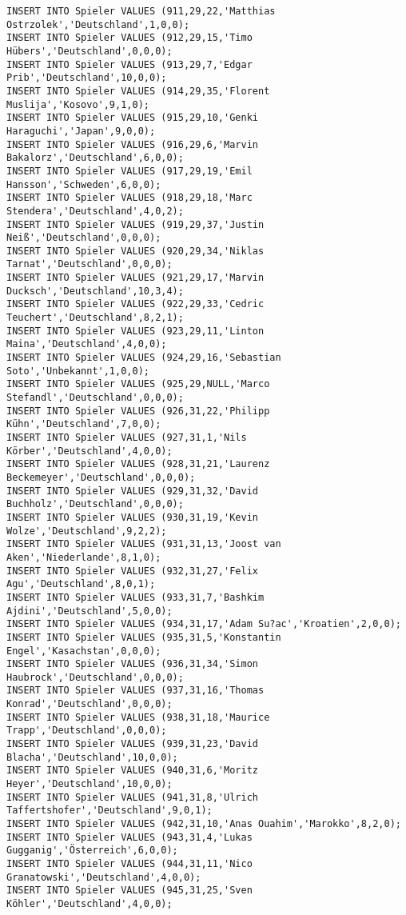 \documentclass{lehramt-informatik-aufgabe}
\begin{document}
\begin{verbatim}
INSERT INTO Spieler VALUES (911,29,22,'Matthias Ostrzolek','Deutschland',1,0,0);
INSERT INTO Spieler VALUES (912,29,15,'Timo Hübers','Deutschland',0,0,0);
INSERT INTO Spieler VALUES (913,29,7,'Edgar Prib','Deutschland',10,0,0);
INSERT INTO Spieler VALUES (914,29,35,'Florent Muslija','Kosovo',9,1,0);
INSERT INTO Spieler VALUES (915,29,10,'Genki Haraguchi','Japan',9,0,0);
INSERT INTO Spieler VALUES (916,29,6,'Marvin Bakalorz','Deutschland',6,0,0);
INSERT INTO Spieler VALUES (917,29,19,'Emil Hansson','Schweden',6,0,0);
INSERT INTO Spieler VALUES (918,29,18,'Marc Stendera','Deutschland',4,0,2);
INSERT INTO Spieler VALUES (919,29,37,'Justin Neiß','Deutschland',0,0,0);
INSERT INTO Spieler VALUES (920,29,34,'Niklas Tarnat','Deutschland',0,0,0);
INSERT INTO Spieler VALUES (921,29,17,'Marvin Ducksch','Deutschland',10,3,4);
INSERT INTO Spieler VALUES (922,29,33,'Cedric Teuchert','Deutschland',8,2,1);
INSERT INTO Spieler VALUES (923,29,11,'Linton Maina','Deutschland',4,0,0);
INSERT INTO Spieler VALUES (924,29,16,'Sebastian Soto','Unbekannt',1,0,0);
INSERT INTO Spieler VALUES (925,29,NULL,'Marco Stefandl','Deutschland',0,0,0);
INSERT INTO Spieler VALUES (926,31,22,'Philipp Kühn','Deutschland',7,0,0);
INSERT INTO Spieler VALUES (927,31,1,'Nils Körber','Deutschland',4,0,0);
INSERT INTO Spieler VALUES (928,31,21,'Laurenz Beckemeyer','Deutschland',0,0,0);
INSERT INTO Spieler VALUES (929,31,32,'David Buchholz','Deutschland',0,0,0);
INSERT INTO Spieler VALUES (930,31,19,'Kevin Wolze','Deutschland',9,2,2);
INSERT INTO Spieler VALUES (931,31,13,'Joost van Aken','Niederlande',8,1,0);
INSERT INTO Spieler VALUES (932,31,27,'Felix Agu','Deutschland',8,0,1);
INSERT INTO Spieler VALUES (933,31,7,'Bashkim Ajdini','Deutschland',5,0,0);
INSERT INTO Spieler VALUES (934,31,17,'Adam Su?ac','Kroatien',2,0,0);
INSERT INTO Spieler VALUES (935,31,5,'Konstantin Engel','Kasachstan',0,0,0);
INSERT INTO Spieler VALUES (936,31,34,'Simon Haubrock','Deutschland',0,0,0);
INSERT INTO Spieler VALUES (937,31,16,'Thomas Konrad','Deutschland',0,0,0);
INSERT INTO Spieler VALUES (938,31,18,'Maurice Trapp','Deutschland',0,0,0);
INSERT INTO Spieler VALUES (939,31,23,'David Blacha','Deutschland',10,0,0);
INSERT INTO Spieler VALUES (940,31,6,'Moritz Heyer','Deutschland',10,0,0);
INSERT INTO Spieler VALUES (941,31,8,'Ulrich Taffertshofer','Deutschland',9,0,1);
INSERT INTO Spieler VALUES (942,31,10,'Anas Ouahim','Marokko',8,2,0);
INSERT INTO Spieler VALUES (943,31,4,'Lukas Gugganig','Österreich',6,0,0);
INSERT INTO Spieler VALUES (944,31,11,'Nico Granatowski','Deutschland',4,0,0);
INSERT INTO Spieler VALUES (945,31,25,'Sven Köhler','Deutschland',4,0,0);

\end{verbatim}
\end{document}
